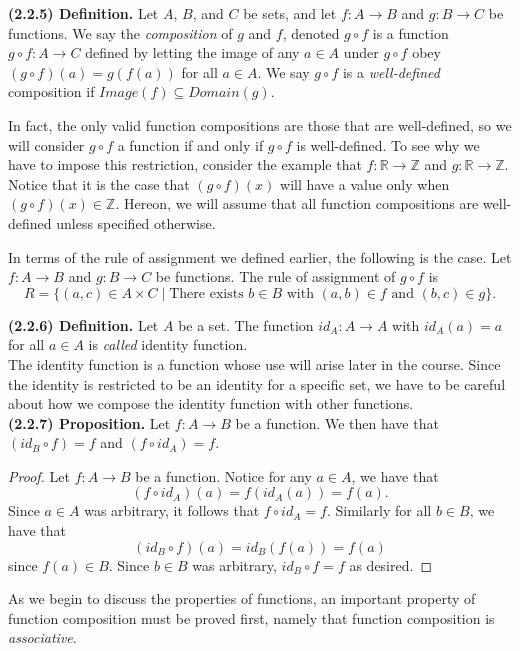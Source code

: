 \documentclass[12pt]{book}
\def\R{{\mathbb{R}}}
\def\Z{{\mathbb{Z}}}
\begin{document}
\noindent\textbf{(2.2.5) Definition.} Let $A$, $B$, and $C$ be sets, and let $f:A\rightarrow B$ and $g:B\rightarrow C$ be functions. We say the \textit{composition} of $g$ and $f$, denoted $g\circ f$ is a function $g\circ f:A\rightarrow C$ defined by letting the image of any $a\in A$ under $g\circ f$ obey $(g\circ f)(a)=g(f(a))$ for all  $a\in A$. We say $g\circ f$ is a \textit{well-defined} composition if $Image(f)\subseteq Domain(g)$.

In fact, the only valid function compositions are those that are well-defined, so we will consider $g\circ f$ a function if and only if $g\circ f$ is well-defined. To see why we have to impose this restriction, consider the example that $f:\R\rightarrow\Z$ and $g:\R\rightarrow\Z$. Notice that it is the case that $(g\circ f)(x)$ will have a value only when $(g\circ f)(x)\in\Z$. Hereon, we will assume that all function compositions are well-defined unless specified otherwise.

In terms of the rule of assignment we defined earlier, the following is the case. Let $f\colon A\rightarrow B$ and $g\colon B\rightarrow C$ be functions. The rule of assignment of $g\circ f$ is
\[R=\{(a,c)\in A\times C\mid \text{There exists }b\in B\text{ with } (a,b)\in f\text{ and } (b,c)\in g\}.\]


\noindent\textbf{(2.2.6) Definition.} Let $A$ be a set. The function $id_A\colon A\rightarrow A$ with $id_A(a)=a$ for all $a\in A$ is \textit{called} identity function.\\

The identity function is a function whose use will arise later in the course. Since the identity is restricted to be an identity for a specific set, we have to be careful about how we compose the identity function with other functions.\\

\noindent\textbf{(2.2.7) Proposition.} Let $f:A\rightarrow B$ be a function. We then have that $(id_B\circ f)=f$ and $(f\circ id_A)=f$.
\begin{proof}
Let $f:A\rightarrow B$ be a function. Notice for any $a\in A$, we have that
\[(f\circ id_A)(a)=f(id_A(a))=f(a).\]
Since $a\in A$ was arbitrary, it follows that $f\circ id_A=f$. Similarly for all $b\in B$, we have that
\[(id_B\circ f)(a)=id_B(f(a))=f(a)\]
since $f(a)\in B$. Since $b\in B$ was arbitrary, $id_B\circ f=f$ as desired.
\end{proof}

As we begin to discuss the properties of functions, an important property of function composition must be proved first, namely that function composition is \textit{associative}.\\
\end{document}

